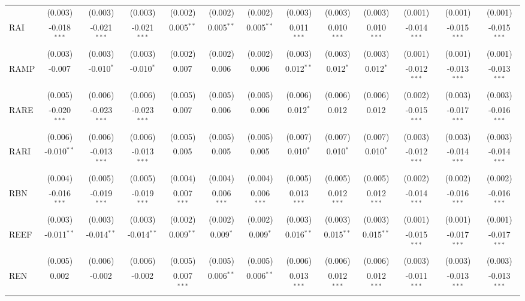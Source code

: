 \begin{table}[!htbp]
\begin{tabular}{@{\extracolsep{5pt}}lcccccccccccc}
  & (0.003) & (0.003) & (0.003) & (0.002) & (0.002) & (0.002) & (0.003) & (0.003) & (0.003) & (0.001) & (0.001) & (0.001) \\
 RAI & -0.018$^{***}$ & -0.021$^{***}$ & -0.021$^{***}$ & 0.005$^{**}$ & 0.005$^{**}$ & 0.005$^{**}$ & 0.011$^{***}$ & 0.010$^{***}$ & 0.010$^{***}$ & -0.014$^{***}$ & -0.015$^{***}$ & -0.015$^{***}$ \\
  & (0.003) & (0.003) & (0.003) & (0.002) & (0.002) & (0.002) & (0.003) & (0.003) & (0.003) & (0.001) & (0.001) & (0.001) \\
 RAMP & -0.007$^{}$ & -0.010$^{*}$ & -0.010$^{*}$ & 0.007$^{}$ & 0.006$^{}$ & 0.006$^{}$ & 0.012$^{**}$ & 0.012$^{*}$ & 0.012$^{*}$ & -0.012$^{***}$ & -0.013$^{***}$ & -0.013$^{***}$ \\
  & (0.005) & (0.006) & (0.006) & (0.005) & (0.005) & (0.005) & (0.006) & (0.006) & (0.006) & (0.002) & (0.003) & (0.003) \\
 RARE & -0.020$^{***}$ & -0.023$^{***}$ & -0.023$^{***}$ & 0.007$^{}$ & 0.006$^{}$ & 0.006$^{}$ & 0.012$^{*}$ & 0.012$^{}$ & 0.012$^{}$ & -0.015$^{***}$ & -0.017$^{***}$ & -0.016$^{***}$ \\
  & (0.006) & (0.006) & (0.006) & (0.005) & (0.005) & (0.005) & (0.007) & (0.007) & (0.007) & (0.003) & (0.003) & (0.003) \\
 RARI & -0.010$^{**}$ & -0.013$^{***}$ & -0.013$^{***}$ & 0.005$^{}$ & 0.005$^{}$ & 0.005$^{}$ & 0.010$^{*}$ & 0.010$^{*}$ & 0.010$^{*}$ & -0.012$^{***}$ & -0.014$^{***}$ & -0.014$^{***}$ \\
  & (0.004) & (0.005) & (0.005) & (0.004) & (0.004) & (0.004) & (0.005) & (0.005) & (0.005) & (0.002) & (0.002) & (0.002) \\
 RBN & -0.016$^{***}$ & -0.019$^{***}$ & -0.019$^{***}$ & 0.007$^{***}$ & 0.006$^{***}$ & 0.006$^{***}$ & 0.013$^{***}$ & 0.012$^{***}$ & 0.012$^{***}$ & -0.014$^{***}$ & -0.016$^{***}$ & -0.016$^{***}$ \\
  & (0.003) & (0.003) & (0.003) & (0.002) & (0.002) & (0.002) & (0.003) & (0.003) & (0.003) & (0.001) & (0.001) & (0.001) \\
 REEF & -0.011$^{**}$ & -0.014$^{**}$ & -0.014$^{**}$ & 0.009$^{**}$ & 0.009$^{*}$ & 0.009$^{*}$ & 0.016$^{**}$ & 0.015$^{**}$ & 0.015$^{**}$ & -0.015$^{***}$ & -0.017$^{***}$ & -0.017$^{***}$ \\
  & (0.005) & (0.006) & (0.006) & (0.005) & (0.005) & (0.005) & (0.006) & (0.006) & (0.006) & (0.003) & (0.003) & (0.003) \\
 REN & 0.002$^{}$ & -0.002$^{}$ & -0.002$^{}$ & 0.007$^{***}$ & 0.006$^{**}$ & 0.006$^{**}$ & 0.013$^{***}$ & 0.012$^{***}$ & 0.012$^{***}$ & -0.011$^{***}$ & -0.013$^{***}$ & -0.013$^{***}$ \\

\end{tabular}
\end{table}
